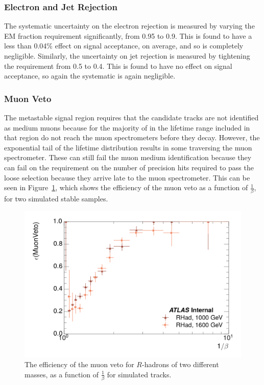 \subsubsection{Electron and Jet Rejection}
The systematic uncertainty on the electron rejection is measured by varying the EM fraction requirement significantly, from 0.95 to 0.9. 
This is found to have a less than 0.04\% effect on signal acceptance, on average, and so is completely negligible. Similarly, the uncertainty on jet rejection is measured by tightening the \ep requirement from 0.5 to 0.4. 
This is found to have no effect on signal acceptance, so again the systematic is again negligible.

\subsubsection{Muon Veto}
The metastable signal region requires that the candidate tracks are not identified as medium muons because for the majority of \rhadrons in the lifetime range included in that region do not reach the muon spectrometers before they decay. 
However, the exponential tail of the \rhadron lifetime distribution results in some \rhadrons traversing the muon spectrometer. 
These can still fail the muon medium identification because they can fail on the requirement on the number of precision hits required to pass the loose selection because they arrive late to the muon spectrometer.
This can be seen in Figure~\ref{fig:muonVeto_eff}, which shows the efficiency of the muon veto as a function of $\frac{1}{\beta}$, for two simulated stable \rhadron samples.

\begin{figure}
\centering
\includegraphics[width=\fullfig]{figures/veff_invbeta.png}
\caption{The efficiency of the muon veto for $R$-hadrons of two different masses, as a function of $\frac{1}{\beta}$ for simulated \rhadron tracks.}
\label{fig:muonVeto_eff}
\end{figure}

